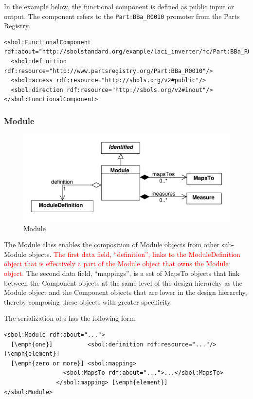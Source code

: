 In the example below, the functional component is defined as public input or output. The component refers to the \texttt{Part:BBa\_R0010} promoter from the Parts Registry.
\begin{lstlisting}
<sbol:FunctionalComponent rdf:about="http://sbolstandard.org/example/laci_inverter/fc/Part:BBa_R0010">
  <sbol:definition rdf:resource="http://www.partsregistry.org/Part:BBa_R0010"/>
  <sbol:access rdf:resource="http://sbols.org/v2#public"/>
  <sbol:direction rdf:resource="http://sbols.org/v2#inout"/>
</sbol:FunctionalComponent>
\end{lstlisting}

\subsubsection{Module}
\label{sec:Module}

\begin{figure}[ht]
\begin{center}
\includegraphics[scale=0.6]{uml/module}
\caption[]{Module}
\label{uml:module}
\end{center}
\end{figure}

The Module class enables the composition of Module objects from other sub-Module objects. \textcolor{red}{The first data field, ``definition'', links to the ModuleDefinition object that is effectively a part of the Module object that owns the Module object.} The second data field, ``mappings'', is a set of MapsTo objects that link between the Component objects at the same level of the design hierarchy as the Module object and the Component objects that are lower in the design hierarchy, thereby composing these objects with greater specificity.


The serialization of s has the following form.
\begin{lstlisting}
<sbol:Module rdf:about="...">
  [\emph{one}]          <sbol:definition rdf:resource="..."/>[\emph{element}]
  [\emph{zero or more}] <sbol:mapping>
                 <sbol:MapsTo rdf:about="...">...</sbol:MapsTo>
               </sbol:mapping> [\emph{element}]
</sbol:Module>
\end{lstlisting}

